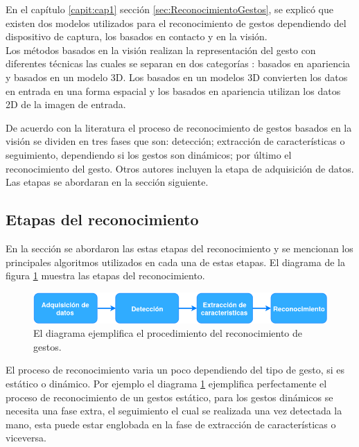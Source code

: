 En el capítulo \ref{capit:cap1} sección \ref{sec:ReconocimientoGestos}, se explicó que existen dos modelos utilizados para el reconocimiento de gestos dependiendo del dispositivo de captura, los basados en contacto y en la visión.\\
Los métodos basados en la visión realizan la representación del gesto con diferentes técnicas las cuales se separan en dos categorías \citep{Rautaray2012}: basados en apariencia y basados en un modelo 3D. Los basados en un modelos 3D convierten los datos en entrada en una forma espacial y los basados en apariencia utilizan los datos 2D de la imagen de entrada.      

De acuerdo con la literatura el proceso de reconocimiento de gestos basados en la visión se dividen en tres \citep{Rautaray2012} fases que son: detección; extracción de características o seguimiento, dependiendo si los gestos son dinámicos; por último el reconocimiento del gesto. Otros autores \citep{Hasan2012} incluyen la etapa de adquisición de datos. Las etapas se abordaran en la sección siguiente. 


\subsection{Etapas del reconocimiento}\label{subsec:EtapasReconocimiento}  
En la sección se abordaron las estas etapas del reconocimiento y se mencionan los principales algoritmos utilizados en cada una de estas etapas. El diagrama de la figura \ref{fig:HGR} muestra las etapas del reconocimiento.  

\begin{figure}[h!]
\begin{center}
\includegraphics[scale=.6]{./Figures/HGR.png}
\end{center}
\caption{El diagrama ejemplifica el procedimiento del reconocimiento de gestos.}
\label{fig:HGR}
\end{figure}

El proceso de reconocimiento varia un poco dependiendo del tipo de gesto, si es estático o dinámico. Por ejemplo el diagrama \ref{fig:HGR} ejemplifica perfectamente el proceso de reconocimiento de un gestos estático, para los gestos dinámicos se necesita una fase extra, el seguimiento el cual se realizada una vez detectada la mano, esta puede estar englobada en la fase de extracción de características o viceversa. 

